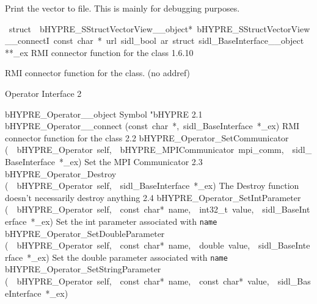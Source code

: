 \documentclass{article}
\begin{document}
\begin{cxxentry}
\begin{cxxentry}
\begin{cxxfunction}
\begin{cxxdoc}
Print the vector to file.  This is mainly for debugging
purposes.
\end{cxxdoc}
\end{cxxfunction}
\begin{cxxvariable}
{\ struct\ \ bHYPRE\_SStructVectorView\_\_object*\ bHYPRE\_SStructVectorView\_\_connectI\ const\ char\ *\ url\ sidl\_bool\ ar\ struct\ sidl\_BaseInterface\_\_object}
        {**\_ex}
        {}
        {
RMI connector function for the class}
        {1.6.10}
\begin{cxxdoc}

RMI connector function for the class. (no addref)
\end{cxxdoc}
\end{cxxvariable}
\end{cxxentry}
\end{cxxentry}
\begin{cxxentry}
{}
        {Operator Interface}
        {}
        {
}
        {2}
\begin{cxxnames}
        {bHYPRE\_Operator\_\_object}
        {}
        {
Symbol "bHYPRE}
        {2.1}
        {bHYPRE\_Operator\_\_connect}
        {(const\ char\ *,\ sidl\_BaseInterface\ *\_ex)}
        {
RMI connector function for the class}
        {2.2}
        {bHYPRE\_Operator\_SetCommunicator}
        {(\ \ bHYPRE\_Operator\ self,\ \ bHYPRE\_MPICommunicator\ mpi\_comm,\ \ sidl\_BaseInterface\ *\_ex)}
        {
Set the MPI Communicator}
        {2.3}
        {bHYPRE\_Operator\_Destroy}
        {(\ \ bHYPRE\_Operator\ self,\ \ sidl\_BaseInterface\ *\_ex)}
        {
The Destroy function doesn't necessarily destroy anything}
        {2.4}
        {bHYPRE\_Operator\_SetIntParameter}
        {(\ \ bHYPRE\_Operator\ self,\ \ const\ char*\ name,\ \ int32\_t\ value,\ \ sidl\_BaseInterface\ *\_ex)}
        {
Set the int parameter associated with {\tt name}}
        {}
\label{cxx.2.6}
        {bHYPRE\_Operator\_SetDoubleParameter}
        {(\ \ bHYPRE\_Operator\ self,\ \ const\ char*\ name,\ \ double\ value,\ \ sidl\_BaseInterface\ *\_ex)}
        {
Set the double parameter associated with {\tt name}}
        {}
\label{cxx.2.7}
        {bHYPRE\_Operator\_SetStringParameter}
        {(\ \ bHYPRE\_Operator\ self,\ \ const\ char*\ name,\ \ const\ char*\ value,\ \ sidl\_BaseInterface\ *\_ex)}

\end{cxxnames}
\end{cxxentry}
\end{document}
